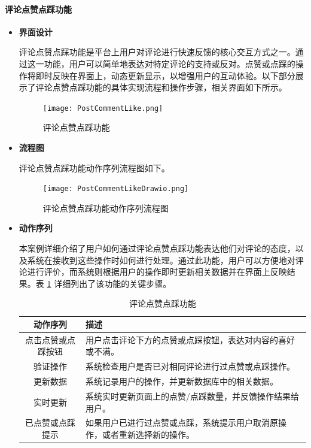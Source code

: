 \paragraph{评论点赞点踩功能}

\begin{itemize}
	\item \textbf{界面设计}
	
	评论点赞点踩功能是平台上用户对评论进行快速反馈的核心交互方式之一。通过这一功能，用户可以简单地表达对特定评论的支持或反对。点赞或点踩的操作将即时反映在界面上，动态更新显示，以增强用户的互动体验。以下部分展示了评论点赞点踩功能的具体实现流程和操作步骤，相关界面如下所示。
	
	\begin{figure}[H]
		\centering
		\texttt{[image: PostCommentLike.png]} 
		\caption{评论点赞点踩功能}
		\label{fig:comment-like}
	\end{figure}
	
	\item \textbf{流程图}
	
	评论点赞点踩功能动作序列流程图如下。
	
	\begin{figure}[H]
		\centering
		\texttt{[image: PostCommentLikeDrawio.png]} 
		\caption{评论点赞点踩功能动作序列流程图}
		\label{fig:comment-like.drawio}
	\end{figure}
	
	\item \textbf{动作序列}
	
	本案例详细介绍了用户如何通过评论点赞点踩功能表达他们对评论的态度，以及系统在接收到这些操作时如何进行处理。通过此功能，用户可以方便地对评论进行评价，而系统则根据用户的操作即时更新相关数据并在界面上反映结果。表 \ref{table:comment-like} 详细列出了该功能的关键步骤。
	
	\begin{table}[H]
		\centering
		\caption{评论点赞点踩功能}
		\renewcommand\arraystretch{1.5}
		\begin{tabular}{|c|>{\raggedright\arraybackslash}p{8cm}|}
			\hline
			\textbf{动作序列} & \textbf{描述} \\ \hline
			点击点赞或点踩按钮 & 用户点击评论下方的点赞或点踩按钮，表达对内容的喜好或不满。 \\ \hline
			验证操作 & 系统检查用户是否已对相同评论进行过点赞或点踩操作。 \\ \hline
			更新数据 & 系统记录用户的操作，并更新数据库中的相关数据。 \\ \hline
			实时更新 & 系统实时更新页面上的点赞/点踩数量，并反馈操作结果给用户。 \\ \hline
			已点赞或点踩提示 & 如果用户已进行过点赞或点踩，系统提示用户取消原操作，或者重新选择新的操作。 \\ \hline
		\end{tabular}
		\label{table:comment-like}
	\end{table}
	

\end{itemize}
